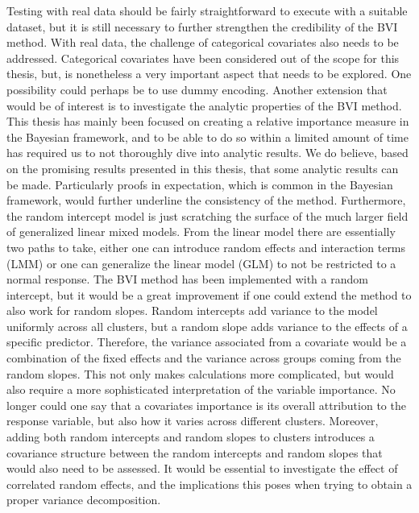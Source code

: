 Testing with real data should be fairly straightforward to execute with a suitable dataset, but it is still necessary to further strengthen the credibility of the BVI method.
With real data, the challenge of categorical covariates also needs to be addressed. 
Categorical covariates have been considered out of the scope for this thesis, but, is nonetheless a very important aspect that needs to be explored.
One possibility could perhaps be to use dummy encoding.
\newline
\newline
Another extension that would be of interest is to investigate the analytic properties of the BVI method. 
This thesis has mainly been focused on creating a relative importance measure in the Bayesian framework, and to be able to do so within a limited amount of time has required us to not thoroughly dive into analytic results.
We do believe, based on the promising results presented in this thesis, that some analytic results can be made. 
Particularly proofs in expectation, which is common in the Bayesian framework, would further underline the consistency of the method. 
\newline
\newline
Furthermore, the random intercept model is just scratching the surface of the much larger field of generalized linear mixed models.
From the linear model there are essentially two paths to take, either one can introduce random effects and interaction terms (LMM) or one can generalize the linear model (GLM) to not be restricted to a normal response. 
The BVI method has been implemented with a random intercept, but it would be a great improvement if one could extend the method to also work for random slopes. 
Random intercepts add variance to the model uniformly across all clusters, but a random slope adds variance to the effects of a specific predictor.
Therefore, the variance associated from a covariate would be a combination of the fixed effects and the variance across groups coming from the random slopes.
This not only makes calculations more complicated, but would also require a more sophisticated interpretation of the variable importance.
No longer could one say that a covariates importance is its overall attribution to the response variable, but also how it varies across different clusters.
Moreover, adding both random intercepts and random slopes to clusters introduces a covariance structure between the random intercepts and random slopes that would also need to be assessed.
It would be essential to investigate the effect of correlated random effects, and the implications this poses when trying to obtain a proper variance decomposition.

